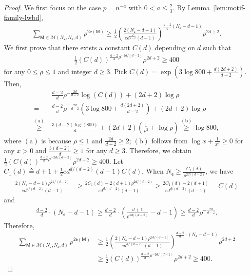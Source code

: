 \documentclass[letterpaper,11pt]{article}
\theoremstyle{definition}
\newcommand{\maM}{\mathcal{M}}
\newcommand{\en}{\mathsf{{e}}}
\newcommand{\pth}[1]{\left( #1 \right)}
\newcommand{\sfM}{{\mathsf{M}}}
\newcommand{\sfe}{{\mathsf{e}}}
\newcommand{\sfv}{{\mathsf{v}}}
\begin{document}
\begin{proof}
We first focus on the case $p = n^{-a}$ with $0<a\le \frac{2}{3}$. By Lemma~\ref{lem:motif-family-lwbd}, \begin{align*}
    \sum_{\sfM\in \maM(N_\sfv,N_\sfe,d)}\rho^{2\en(\sfM)}\ge \frac{1}{2}\pth{\frac{2(N_\sfe-d-1)}{ed^{\frac{d}{d-2}}(d-1)}}^{\frac{d-2}{d}(N_\sfe-d-1)}\rho^{2d+2}.
\end{align*}
We first prove that there exists a constant $C(d)$ depending on $d$ such that \begin{align*}
    \frac{1}{2}(C(d))^{\frac{d-2}{d}\rho^{-2d/(d-2)}}\rho^{2d+2}\ge 400
\end{align*}
for any $0\le \rho\le 1$ and integer $d\ge 3$.
Pick $C(d) = \exp\pth{3\log 800+\frac{d(2d+2)}{d-2}}$. Then, \begin{align*}
    &~\frac{d-2}{d}\rho^{-\frac{2d}{d-2}}\log (C(d))+(2d+2)\log\rho \\=&~ \frac{d-2}{d}\rho^{-\frac{2d}{d-2}}\pth{3\log 800+\frac{d(2d+2)}{d-2}}+(2d+2)\log\rho\\\overset{\mathrm{(a)}}{\ge}&~ \frac{3(d-2)\log(800)}{d}+(2d+2)\pth{\frac{1}{\rho^2}+\log \rho}\overset{\mathrm{(b)}}{\ge}   \log 800,
\end{align*}
where $\mathrm{(a)}$ is because $\rho\le 1$ and $\frac{2d}{d-2}\ge 2$; $\mathrm{(b)}$ follows from $\log x+\frac{1}{x^2}\ge 0$ for any $x>0$ and $\frac{3(d-2)}{d}\ge 1$ for any $d\ge 3$. Therefore, we obtain $\frac{1}{2}(C(d))^{\frac{d-2}{d}\rho^{-2d/(d-2)}} \rho^{2d+2}\ge 400$. Let $C_1(d)\triangleq d+1+\frac{1}{2}e d^{d/(d-2)} (d-1) C(d)$. When $N_\sfe\ge \frac{C_1(d)}{\rho^{2d/(d-2)}}$, we have \begin{align*}
    \frac{2(N_\sfe-d-1)\rho^{2d/(d-2)}}{ed^{d/(d-2)}(d-1)} &\ge \frac{2C_1(d) - 2(d+1) \rho^{2d/(d-2)}}{ed^{d/(d-2)}(d-1)} \ge \frac{2C_1(d) - 2(d+1)}{ed^{d/(d-2)}(d-1)} = C(d)
\end{align*}
and \begin{align*}
    \frac{d-2}{d}\cdot (N_\sfe-d-1) \ge \frac{d-2}{d}\cdot\pth{\frac{d+1}{\rho^{2d/(d-2)}}-d-1} \ge \frac{d-2}{d} \rho^{-\frac{2d}{d-2}}.
\end{align*}
Therefore, \begin{align*}
    \sum_{\sfM\in \maM(N_\sfv,N_\sfe,d)}\rho^{2\en(\sfM)} &\ge \frac{1}{2} \pth{\frac{2(N_\sfe-d-1)\rho^{2d/(d-2)}}{ed^{d/(d-2)}(d-1)}}^{\frac{d-2}{d}\cdot (N_\sfe-d-1)}\rho^{2d+2}\\&\ge \frac{1}{2}(C(d))^{\frac{d-2}{d}\rho^{-2d/(d-2)}} \rho^{2d+2}\ge 400.
\end{align*} 


\end{proof}
\end{document}

